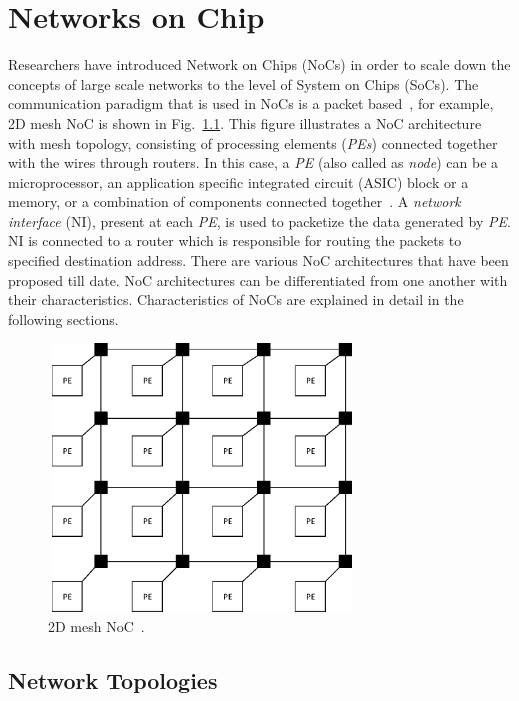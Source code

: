 \chapter {Networks on Chip}
\label{Chapter.two}

Researchers have introduced Network on Chips (NoCs) in order to scale down the concepts of large scale networks to the level of System on Chips (SoCs). The communication paradigm that is used in NoCs is a packet based~\cite{Pasricha, Duato2003}, for example, 2D mesh NoC is shown in Fig.~\ref{fig:2.1}. This figure illustrates a NoC architecture with mesh topology, consisting of processing elements (\textit{PEs})  connected together with the wires through routers. In this case, a \textit{PE} (also called as \textit{node}) can be a microprocessor, an application specific integrated circuit (ASIC) block or a memory, or a combination of components connected together~\cite{Pasricha}. A \textit{network interface} (NI), present at each \textit{PE}, is used to packetize the data generated by \textit{PE}. NI is connected to a router which is responsible for routing the packets to specified destination address. There are various NoC architectures that have been proposed till date. NoC architectures can be differentiated from one another with their characteristics. Characteristics of NoCs are explained in detail in the following sections.


\begin{figure}
\vspace{10mm}
\centering
\includegraphics[height=2.8in, width=3.2in]{Mesh_topology.eps}
\caption [2D mesh NoC topology] {2D mesh NoC~\cite{Pasricha}.}
\label{fig:2.1}
\vspace{10mm}
\end{figure} 


\section{Network Topologies}

